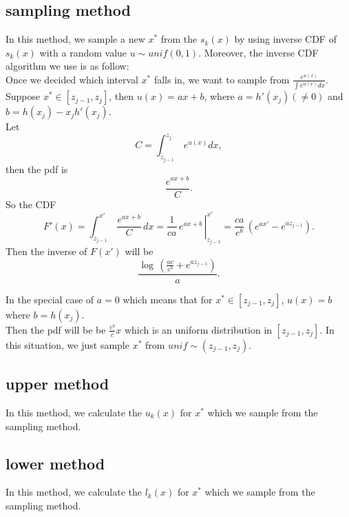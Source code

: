 \documentclass[11pt, oneside]{article}   	%
\begin{document}
\subsection*{ sampling method }
In this method, we sample a new $x^{*}$ from the $s_{k}(x)$ by using inverse CDF of  $s_{k}(x)$ with a random value $u \sim unif(0,1)$. Moreover, the inverse CDF algorithm we use is as follow: \\
Once we decided which interval $x^*$ falls in, we want to sample from $\frac{e^{u(x)}} {\int e^{u(x)} dx}$. Suppose $x^* \in [z_{j-1}, z_j]$, then $u(x) = ax+b $, where $a=h'(x_j)(\neq0)$ and $b=h(x_j)- x_j h'(x_j)$. \\
Let
\begin{displaymath}
C=\int_{z_{j-1}}^{z_j} \, e^{u(x)} dx,
\end{displaymath}
then the pdf is
\begin{displaymath}
\frac{e^{ax+b}}{C}.
\end{displaymath}
So the CDF
\begin{displaymath}
F'(x)=\int_{z_{j-1}}^{x'} \,  \frac{e^{ax+b}}{C} \, dx = \left. \frac{1}{ca}\, e^{ax+b} \, \right|_{z_{j-1}}^{x'} = \frac{ca}{e^b}\,(e^{ax'}-e^{az_{j-1}}).
\end{displaymath}
Then the inverse of $F(x')$ will be
\begin{displaymath}
\frac{\log\,(\frac{ac}{e^b}+e^{az_{j-1}})}{a}.
\end{displaymath}


In the special case of $a=0$ which means that for $x^* \in [z_{j-1}, z_j]$, $u(x) = b $ where $b=h(x_j)$. \\Then the pdf will be  be $ \frac{e^b}{c}x $ which is an uniform distribution in $[z_{j-1}, z_j]$. In this situation, we just sample $x^*$ from $unif \sim  (z_{j-1}, z_j)$.





\subsection*{ upper method }
In this method, we calculate the $u_{k}(x)$ for $x^*$ which we sample from the sampling method.


\subsection*{ lower method }
In this method, we calculate the $l_{k}(x)$ for $x^*$ which we sample from the sampling method.
\end{document}
